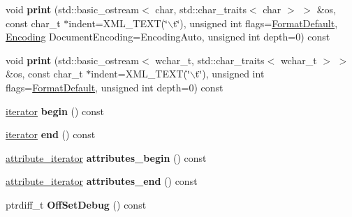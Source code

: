 \begin{DoxyCompactItemize}
\item 
\hypertarget{classphys_1_1xml_1_1Node_a99158a08970f0497a3925dddf8227b87}{
void {\bfseries print} (std::basic\_\-ostream$<$ char, std::char\_\-traits$<$ char $>$ $>$ \&os, const char\_\-t $\ast$indent=XML\_\-TEXT(\char`\"{}$\backslash$t\char`\"{}), unsigned int flags=\hyperlink{namespacephys_1_1xml_a08bf6aab51f79929d9097706a5e64408}{FormatDefault}, \hyperlink{namespacephys_1_1xml_a420f5de782438f88160321385bea2015}{Encoding} DocumentEncoding=EncodingAuto, unsigned int depth=0) const }
\label{d7/d0a/classphys_1_1xml_1_1Node_a99158a08970f0497a3925dddf8227b87}

\item 
\hypertarget{classphys_1_1xml_1_1Node_a27b7869e5208547e06b6164bbc68ca0e}{
void {\bfseries print} (std::basic\_\-ostream$<$ wchar\_\-t, std::char\_\-traits$<$ wchar\_\-t $>$ $>$ \&os, const char\_\-t $\ast$indent=XML\_\-TEXT(\char`\"{}$\backslash$t\char`\"{}), unsigned int flags=\hyperlink{namespacephys_1_1xml_a08bf6aab51f79929d9097706a5e64408}{FormatDefault}, unsigned int depth=0) const }
\label{d7/d0a/classphys_1_1xml_1_1Node_a27b7869e5208547e06b6164bbc68ca0e}

\item 
\hypertarget{classphys_1_1xml_1_1Node_a78c82f35dcf7b2c37f1f5ff37d526329}{
\hyperlink{classphys_1_1xml_1_1NodeIterator}{iterator} {\bfseries begin} () const }
\label{d7/d0a/classphys_1_1xml_1_1Node_a78c82f35dcf7b2c37f1f5ff37d526329}

\item 
\hypertarget{classphys_1_1xml_1_1Node_ae69ca8be6e9eb53a4faf8bb50a2996d6}{
\hyperlink{classphys_1_1xml_1_1NodeIterator}{iterator} {\bfseries end} () const }
\label{d7/d0a/classphys_1_1xml_1_1Node_ae69ca8be6e9eb53a4faf8bb50a2996d6}

\item 
\hypertarget{classphys_1_1xml_1_1Node_a601285bed116eb5d63cea9a8d117e5b7}{
\hyperlink{classphys_1_1xml_1_1AttributeIterator}{attribute\_\-iterator} {\bfseries attributes\_\-begin} () const }
\label{d7/d0a/classphys_1_1xml_1_1Node_a601285bed116eb5d63cea9a8d117e5b7}

\item 
\hypertarget{classphys_1_1xml_1_1Node_a9af9e0bff5b8ed06bc40861dccb6b4ec}{
\hyperlink{classphys_1_1xml_1_1AttributeIterator}{attribute\_\-iterator} {\bfseries attributes\_\-end} () const }
\label{d7/d0a/classphys_1_1xml_1_1Node_a9af9e0bff5b8ed06bc40861dccb6b4ec}

\item 
\hypertarget{classphys_1_1xml_1_1Node_a3c29eb5ecbe37642f29ccdd0be3efbe3}{
ptrdiff\_\-t {\bfseries OffSetDebug} () const }
\label{d7/d0a/classphys_1_1xml_1_1Node_a3c29eb5ecbe37642f29ccdd0be3efbe3}


\end{DoxyCompactItemize}
